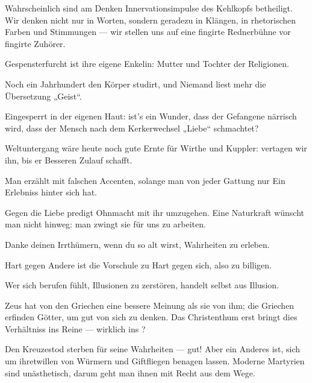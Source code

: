 Wahrscheinlich sind am Denken Innervationsimpulse des Kehlkopfs betheiligt. Wir denken nicht nur in Worten, sondern geradezu in Klängen, in rhetorischen Farben und Stimmungen — wir stellen uns auf eine fingirte Rednerbühne vor fingirte Zuhörer.
\par

Gespensterfurcht ist ihre eigene Enkelin: Mutter und Tochter der Religionen.
\par

Noch ein Jahrhundert den Körper studirt, und Niemand liest mehr die Übersetzung „Geist“.
\par

Eingesperrt in der eigenen Haut: ist’s ein Wunder, dass der Gefangene närrisch wird, dass der Mensch nach dem Kerkerwechsel „Liebe“ schmachtet?
\par

Weltuntergang wäre heute noch gute Ernte für Wirthe und Kuppler: vertagen wir ihn, bis er Besseren Zulauf schafft.
\par

Man erzählt mit falschen Accenten, solange man von jeder Gattung nur Ein Erlebniss hinter sich hat.
\par

Gegen die Liebe predigt Ohnmacht mit ihr umzugehen. Eine Naturkraft wünscht man nicht hinweg: man zwingt sie für uns zu arbeiten.
\par

Danke deinen Irrthümern, wenn du so alt wirst, Wahrheiten zu erleben.
\par

Hart gegen Andere ist die Vorschule zu Hart gegen sich, also  zu billigen.
\par

Wer sich berufen fühlt, Illusionen zu zerstören, handelt selbst aus Illusion.
\par

Zeus hat von den Griechen eine bessere Meinung als sie von ihm; die Griechen erfinden Götter, um gut von sich zu denken. Das Christenthum erst bringt dies Verhältniss ins Reine — wirklich ins ?
\par

Den Kreuzestod sterben für seine Wahrheiten — gut! Aber ein Anderes ist, sich um ihretwillen von Würmern und Giftfliegen benagen lassen. Moderne Martyrien sind unästhetisch, darum geht man ihnen mit Recht aus dem Wege.
\par

